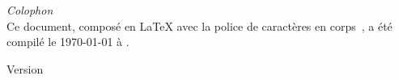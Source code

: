 \def\grabtimezone #1#2#3#4#5#6#7#8#9{\grabtimezoneB}
\def\grabtimezoneB #1#2#3#4#5#6#7{\grabtimezoneC}
\def\grabtimezoneC #1#2'#3'{UTC#1#2\string:#3}
\begin{center}
\vspace*{0.1\textheight}
{\Large \itshape Colophon}
\vfill 
\textcolor{DarkRed}{\Huge\aldine}\\[0.1\textheight]
\normalsize
\shapepar{\squareshape}
Ce document, composé en \LaTeX{} avec la police de caractères \police{} en corps~\corps, a été compilé le \today{} à \thistime[\ h\ ]
\expandafter\grabtimezone\pdfcreationdate.
    
\vspace*{0.1\textheight}
Version 
\end{center}
\vfill
\mbox{}